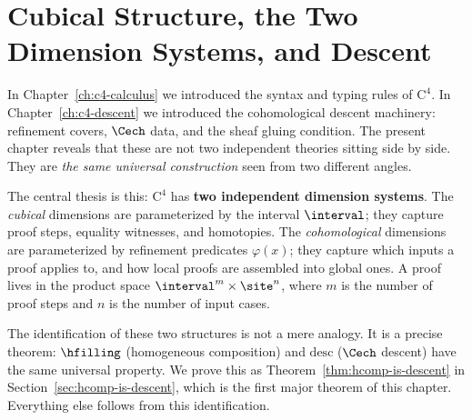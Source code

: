 %

\chapter{Cubical Structure, the Two Dimension Systems, and Descent}
\label{ch:c4-cubical}

In Chapter~\ref{ch:c4-calculus} we introduced the syntax and typing rules of
$\mathrm{C}^4$.  In Chapter~\ref{ch:c4-descent} we introduced the cohomological
descent machinery: refinement covers, $\Cech$ data, and the sheaf gluing condition.
The present chapter reveals that these are not two independent theories sitting
side by side.  They are \emph{the same universal construction} seen from two
different angles.

The central thesis is this: $\mathrm{C}^4$ has \textbf{two independent
dimension systems}.  The \emph{cubical} dimensions are parameterized by the
interval $\interval$; they capture proof steps, equality witnesses, and
homotopies.  The \emph{cohomological} dimensions are parameterized by
refinement predicates $\varphi(x)$; they capture which inputs a proof applies
to, and how local proofs are assembled into global ones.  A proof lives in the
product space $\interval^m \times \site^n$, where $m$ is the number of proof
steps and $n$ is the number of input cases.

The identification of these two structures is not a mere analogy.  It is
a precise theorem: $\hfilling$ (homogeneous composition) and
$\mathrm{desc}$ ($\Cech$ descent) have the same universal property.  We prove
this as Theorem~\ref{thm:hcomp-is-descent} in
Section~\ref{sec:hcomp-is-descent}, which is the first major theorem of this
chapter.  Everything else follows from this identification.

